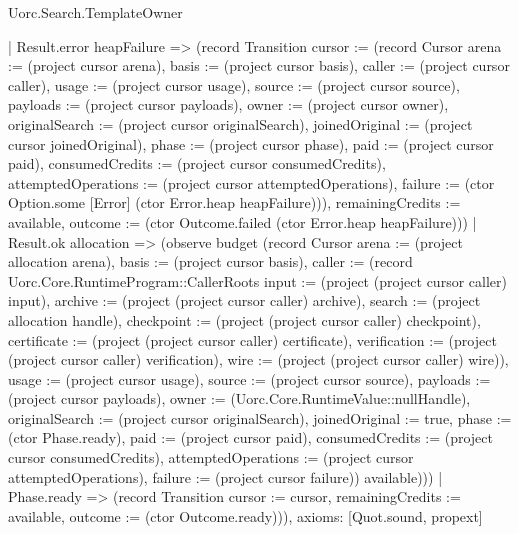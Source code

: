 \begin{lexlean}{Uorc.Search.TemplateOwner}
\begin{semanticmodule}
{      | Result.error heapFailure => (record Transition {cursor := (record Cursor {arena := (project cursor arena), basis := (project cursor basis), caller := (project cursor caller), usage := (project cursor usage), source := (project cursor source), payloads := (project cursor payloads), owner := (project cursor owner), originalSearch := (project cursor originalSearch), joinedOriginal := (project cursor joinedOriginal), phase := (project cursor phase), paid := (project cursor paid), consumedCredits := (project cursor consumedCredits), attemptedOperations := (project cursor attemptedOperations), failure := (ctor Option.some [Error] (ctor Error.heap heapFailure))}), remainingCredits := available, outcome := (ctor Outcome.failed (ctor Error.heap heapFailure))})
      | Result.ok allocation => (observe budget (record Cursor {arena := (project allocation arena), basis := (project cursor basis), caller := (record Uorc.Core.RuntimeProgram::CallerRoots {input := (project (project cursor caller) input), archive := (project (project cursor caller) archive), search := (project allocation handle), checkpoint := (project (project cursor caller) checkpoint), certificate := (project (project cursor caller) certificate), verification := (project (project cursor caller) verification), wire := (project (project cursor caller) wire)}), usage := (project cursor usage), source := (project cursor source), payloads := (project cursor payloads), owner := (Uorc.Core.RuntimeValue::nullHandle), originalSearch := (project cursor originalSearch), joinedOriginal := true, phase := (ctor Phase.ready), paid := (project cursor paid), consumedCredits := (project cursor consumedCredits), attemptedOperations := (project cursor attemptedOperations), failure := (project cursor failure)}) available)))
    | Phase.ready => (record Transition {cursor := cursor, remainingCredits := available, outcome := (ctor Outcome.ready)})),
  axioms: [Quot.sound, propext]
}


\end{semanticmodule}
\end{lexlean}
